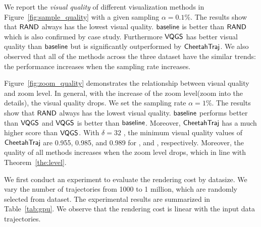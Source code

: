 We report the \textit{visual quality} of different visualization methods in Figure~\ref{fig:sample_quality} with a given sampling $\alpha=0.1\%$. 
The results show that $\mathsf{RAND}$ always has the lowest visual quality. $\mathsf{baseline}$ is better than $\mathsf{RAND}$ which is also confirmed by case study. Furthermore $\mathsf{VQGS}$ has better visual quality than $\mathsf{baseline}$ but is significantly outperformed by $\mathsf{CheetahTraj}$. We also observed that all of the methods across the three dataset have the similar trends: the performance increases when the sampling rate increases.

Figure~\ref{fig:zoom_quality} demonstrates the relationship between visual quality and zoom level. In general, with the increase of the zoom level(zoom into the details), the visual quality drops.
We set the sampling rate $\alpha=1\%$. The results show that $\mathsf{RAND}$ always has the lowest  visual quality. $\mathsf{baseline}$ performs better than $\mathsf{VQGS}$ and $\mathsf{VQGS}$ is better than $\mathsf{baseline}$. Moreover, $\mathsf{CheetahTraj}$ has a much higher score than $\mathsf{VQGS}$. With $\delta=32$ , the minimum visual quality values of $\mathsf{CheetahTraj}$ are 0.955, 0.985, and 0.989 for \pt{}, \cd{} and \sz{}, respectively. Moreover, the quality of all methods increases when the zoom level drops, which in line with Theorem~\ref{the:level}.





We first conduct an experiment to evaluate the rendering cost by datasize. We vary the number of trajectories from 1000 to 1 million, which are randomly selected from \pt{} dataset. The experimental results are summarized in Table~\ref{tab:gpu}. We observe that the rendering cost is linear with the input data trajectories.

